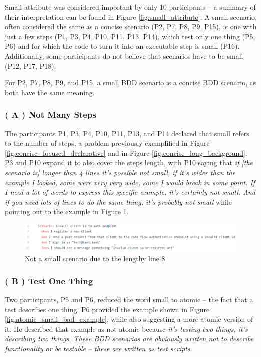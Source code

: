 Small attribute was considered important by only 10 participants -- a summary of their interpretation can be found in Figure \ref{fig:small_attribute}. A small scenario, often considered the same as a concise scenario (P2, P7, P8, P9, P15), is one with just a few steps (P1, P3, P4, P10, P11, P13, P14), which test only one thing (P5, P6) and for which the code to turn it into an executable step is small (P16). Additionally, some participants do not believe that scenarios have to be small (P12, P17, P18).

For P2, P7, P8, P9, and P15, a small BDD scenario is a concise BDD scenario, as both have the same meaning.

\subsubsection{\textbf{( A ) Not Many Steps}}

The participants P1, P3, P4, P10, P11, P13, and P14 declared that small refers to the number of steps, a problem previously exemplified in Figure \ref{fig:concise_focused_declarative} and in Figure \ref{fig:concise_long_background}. P3 and P10 expand it to also cover the steps length, with P10 saying that \textit{if [the scenario is] longer than 4 lines it's possible not small, if it's wider than the example I looked, some were very very wide, some I would break in some point. If I need a lot of words to express this specific example, it's certainly not small. And if you need lots of lines to do the same thing, it's probably not small} while pointing out to the example in Figure \ref{fig:not_small_due_to_lenghty_line}.

\begin{figure}[t]
	\centering
	\includegraphics[scale=0.8]{images/oidc_auth_code_flow_small_bad_example_P10}
	\caption{Not a small scenario due to the lengthy line 8}
	\label{fig:not_small_due_to_lenghty_line}
\end{figure}

\subsubsection{\textbf{( B ) Test One Thing}}
Two participants, P5 and P6, reduced the word small to atomic -- the fact that a test describes one thing. P6 provided the example shown in Figure \ref{fig:atomic_small_bad_example}, while also suggesting a more atomic version of it. He described that example as not atomic because \textit{it's testing two things, it's describing two things. These BDD scenarios are obviously written not to describe functionality or be testable -- these are written as test scripts}.

